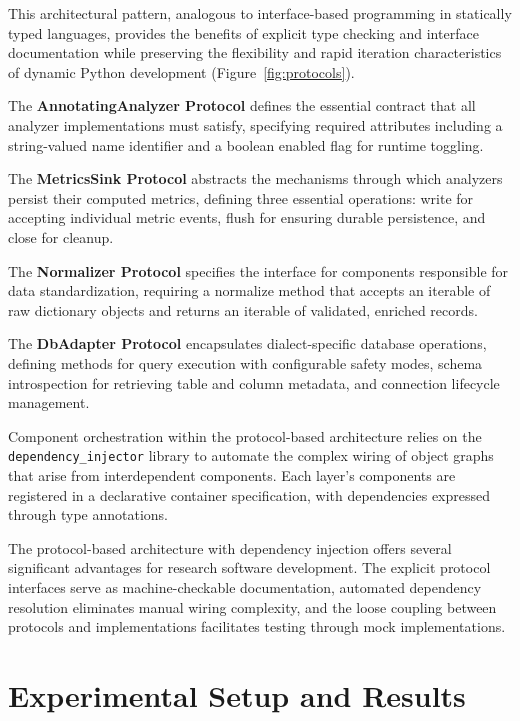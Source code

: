 \documentclass[]{einformatica}
\begin{document}
This architectural pattern, analogous to interface-based programming in statically typed languages, provides the benefits of explicit type checking and interface documentation while preserving the flexibility and rapid iteration characteristics of dynamic Python development (Figure~\ref{fig:protocols}).

The \textbf{AnnotatingAnalyzer Protocol} defines the essential contract that all analyzer implementations must satisfy, specifying required attributes including a string-valued name identifier and a boolean enabled flag for runtime toggling.

The \textbf{MetricsSink Protocol} abstracts the mechanisms through which analyzers persist their computed metrics, defining three essential operations: write for accepting individual metric events, flush for ensuring durable persistence, and close for cleanup.

The \textbf{Normalizer Protocol} specifies the interface for components responsible for data standardization, requiring a normalize method that accepts an iterable of raw dictionary objects and returns an iterable of validated, enriched records.

The \textbf{DbAdapter Protocol} encapsulates dialect-specific database operations, defining methods for query execution with configurable safety modes, schema introspection for retrieving table and column metadata, and connection lifecycle management.

Component orchestration within the protocol-based architecture relies on the \texttt{dependency\_injector} library to automate the complex wiring of object graphs that arise from interdependent components. Each layer's components are registered in a declarative container specification, with dependencies expressed through type annotations.

The protocol-based architecture with dependency injection offers several significant advantages for research software development. The explicit protocol interfaces serve as machine-checkable documentation, automated dependency resolution eliminates manual wiring complexity, and the loose coupling between protocols and implementations facilitates testing through mock implementations.

\section{Experimental Setup and Results}\label{sec:Results}
\end{document}

